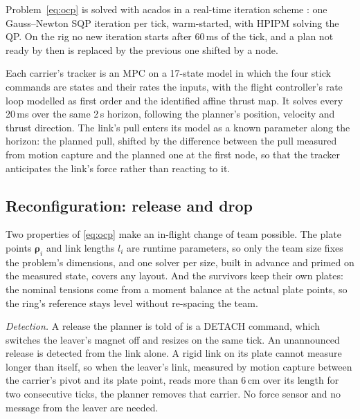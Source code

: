 Problem~\eqref{eq:ocp} is solved with acados \cite{verschueren2022acados} in a real-time iteration scheme
\cite{diehl2002rti}: one Gauss--Newton SQP iteration per tick, warm-started, with HPIPM \cite{frison2020hpipm}
solving the QP. On the rig no new iteration starts after 60\,ms of the tick, and a plan not ready by then is replaced
by the previous one shifted by a node.

Each carrier's tracker is an MPC on a 17-state model in which the four stick commands are states and their rates the
inputs, with the flight controller's rate loop modelled as first order and the identified affine thrust map. It
solves every 20\,ms over the same 2\,s horizon, following the planner's position, velocity and thrust direction. The
link's pull enters its model as a known parameter along the horizon: the planned pull, shifted by the difference
between the pull measured from motion capture and the planned one at the first node, so that the tracker anticipates
the link's force rather than reacting to it.

\subsection{Reconfiguration: release and drop}
\label{sec:reconfig}

Two properties of \eqref{eq:ocp} make an in-flight change of team possible. The plate points
$\boldsymbol{\rho}_i$ and link lengths $l_i$ are runtime parameters, so only the team size fixes the problem's
dimensions, and one solver per size, built in advance and primed on the measured state, covers any layout. And the
survivors keep their own plates: the nominal tensions come from a moment balance at the actual plate points, so the
ring's reference stays level without re-spacing the team.

\emph{Detection.} A release the planner is told of is a DETACH command, which switches the leaver's magnet off and
resizes on the same tick. An unannounced release is detected from the link alone. A rigid link on its plate cannot
measure longer than itself, so when the leaver's link, measured by motion capture between the carrier's pivot and
its plate point, reads more than 6\,cm over its length for two consecutive ticks, the planner removes that carrier.
No force sensor and no message from the leaver are needed.

